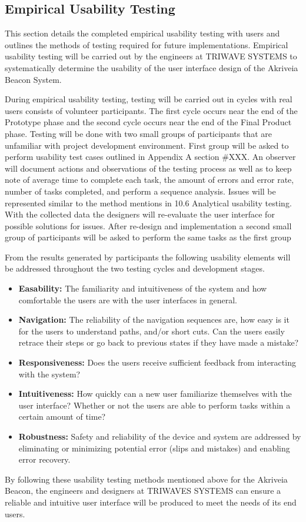

\subsection{Empirical Usability Testing}
\medskip
This section details the completed empirical usability testing with users and outlines the methods of testing required for future implementations. Empirical usability testing will be carried out by the engineers at TRIWAVE SYSTEMS to systematically determine the usability of the user interface design of the Akriveia Beacon System. 

\bigskip
During empirical usability testing, testing will be carried out in cycles with real users consists of volunteer participants. The first cycle occurs near the end of the Prototype phase and the second cycle occurs near the end of the Final Product phase. Testing will be done with two small groups of participants that are unfamiliar with project development environment. First group will be asked to perform usability test cases outlined in Appendix A section \#XXX. An observer will document actions and observations of the testing process as well as to keep note of average time to complete each task, the amount of errors and error rate, number of tasks completed, and perform a sequence analysis. Issues will be represented similar to the method mentions in 10.6 Analytical usability testing. With the collected data the designers will re-evaluate the user interface for possible solutions for issues. After re-design and implementation a second small group of participants will be asked to perform the same tasks as the first group

\bigskip
From the results generated by participants the following usability elements will be addressed throughout the two testing cycles and development stages. 

\medskip

\begin{itemize}
\setlength\itemsep{0.1mm}
	\item \textbf{Easability:} The familiarity and intuitiveness of the system and how comfortable the users are with the user interfaces in general. 
	\item \textbf{Navigation:} The reliability of the navigation sequences are, how easy is it for the users to understand paths, and/or short cuts. Can the users easily retrace their steps or go back to previous states if they have made a mistake?
	\item \textbf{Responsiveness:} Does the users receive sufficient feedback from interacting with the system? 
	\item \textbf{Intuitiveness:} How quickly can a new user familiarize themselves with the user interface? Whether or not the users are able to perform tasks within a certain amount of time?
	\item \textbf{Robustness:} Safety and reliability of the device and system are addressed by eliminating or minimizing potential error (slips and mistakes) and enabling error recovery.
\end{itemize}

\medskip
By following these usability testing methods mentioned above for the Akriveia Beacon, the engineers and designers at TRIWAVES SYSTEMS can ensure a reliable and intuitive user interface will be produced to meet the needs of its end users. 
